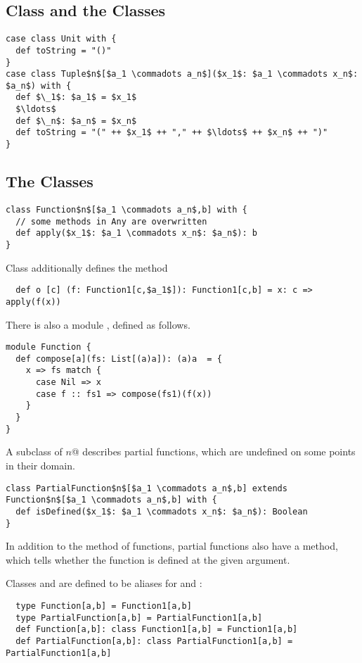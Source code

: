 \documentclass[a4paper,12pt,twoside,titlepage]{book}
\begin{document}
\subsection{Class  and the  Classes}
\label{sec:cls-tuple}

\begin{lstlisting}
case class Unit with {
  def toString = "()"
}
case class Tuple$n$[$a_1 \commadots a_n$]($x_1$: $a_1 \commadots x_n$: $a_n$) with {
  def $\_1$: $a_1$ = $x_1$
  $\ldots$
  def $\_n$: $a_n$ = $x_n$
  def toString = "(" ++ $x_1$ ++ "," ++ $\ldots$ ++ $x_n$ ++ ")"
}
\end{lstlisting}

\subsection{The  Classes}
\label{sec:cls-function}

\begin{lstlisting}
class Function$n$[$a_1 \commadots a_n$,b] with {
  // some methods in Any are overwritten
  def apply($x_1$: $a_1 \commadots x_n$: $a_n$): b
}
\end{lstlisting}
Class  additionally defines the method
\begin{lstlisting}
  def o [c] (f: Function1[c,$a_1$]): Function1[c,b] = x: c => apply(f(x))
\end{lstlisting}
There is also a module , defined as follows.
\begin{lstlisting}
module Function {
  def compose[a](fs: List[(a)a]): (a)a  = {
    x => fs match {
      case Nil => x
      case f :: fs1 => compose(fs1)(f(x))
    }
  }
}
\end{lstlisting}
A subclass of \lstinline@Function$n$@ describes partial functions, which
are undefined on some points in their domain.

\begin{lstlisting}
class PartialFunction$n$[$a_1 \commadots a_n$,b] extends Function$n$[$a_1 \commadots a_n$,b] with {
  def isDefined($x_1$: $a_1 \commadots x_n$: $a_n$): Boolean
}
\end{lstlisting}

In addition to the  method of functions, partial functions
also have a  method, which tells whether the function
is defined at the given argument.

Classes  and  are defined to be aliases for
 and :
\begin{lstlisting}
  type Function[a,b] = Function1[a,b]
  type PartialFunction[a,b] = PartialFunction1[a,b]
  def Function[a,b]: class Function1[a,b] = Function1[a,b]
  def PartialFunction[a,b]: class PartialFunction1[a,b] = PartialFunction1[a,b]
\end{lstlisting}
\end{document}
